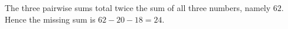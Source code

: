 The three pairwise sums total twice the sum of all three numbers, namely $62$. Hence the missing sum is $62-20-18=\boxed{24}$.

